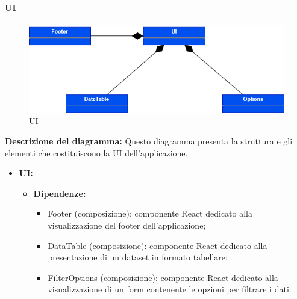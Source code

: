 \paragraph{UI}
\begin{figure}[h!] \centering
    \includegraphics[scale=0.45]{template/images/uml_front/ui/ui.png}
    \caption{UI}
\end{figure}
\textbf{Descrizione del diagramma:}
Questo diagramma presenta la struttura e gli elementi che costituiscono la UI dell'applicazione.
\begin{itemize}
    \item \textbf{UI:}
    \begin{itemize}
        \item \textbf{Dipendenze:}
        \begin{itemize}
            \item Footer (composizione): componente React dedicato alla visualizzazione del footer dell'applicazione;
            \item DataTable (composizione): componente React dedicato alla presentazione di un dataset in formato tabellare;
            \item FilterOptions (composizione): componente React dedicato alla visualizzazione di un form contenente le opzioni per filtrare i dati.
        \end{itemize} 
    \end{itemize}
\end{itemize}

\pagebreak

